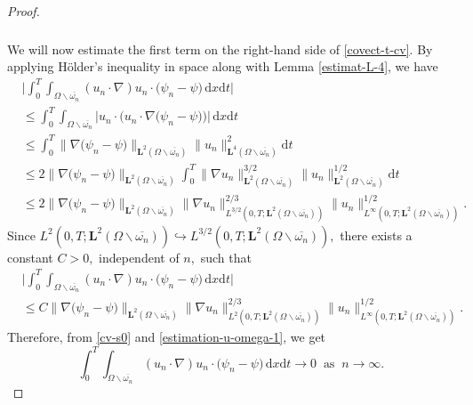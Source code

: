 \documentclass[a4paper,12pt,reqno,natbib]{amsart}
\newcommand{\dx} {\displaystyle\mathrm{d}x}
\newcommand{\dt} {\displaystyle\mathrm{d}t}
\def\L{\textbf{L}}
\begin{document}
\begin{proof}
\begin{align}
\begin{split}
    \end{split}
\end{align} 
We will now estimate the first term on the right-hand side of \eqref{covect-t-cv}.  By applying H\"older's inequality in space along with Lemma \ref{estimat-L-4}, we have
\begin{align*}
&\big|\int_0^T\int_{\Omega\backslash\overline{\omega_n}} (u_n\cdot \nabla) u_n \cdot \big(\psi_n-\psi\big)\, \dx\dt\big|\\
&\leq\int_0^T\int_{\Omega\backslash\overline{\omega_n}} \big|u_n\cdot\big( u_n\cdot \nabla\big(\psi_n-\psi\big)\big)\big|\, \dx\dt\\
&\leq \int_0^T\big\| \nabla\big(\psi_n-\psi\big) \big\|_{\L^2(\Omega\backslash\overline{\omega_n})} \big\| u_n \big\|_{\L^4(\Omega\backslash\overline{\omega_n})}^2\dt\\
&\leq 2 \big\| \nabla\big(\psi_n-\psi\big) \big\|_{\L^2(\Omega\backslash\overline{\omega_n})} \int_0^T\big\|\nabla u_n \big\|_{\L^2(\Omega\backslash\overline{\omega_n})}^{3/2} \big\| u_n \big\|_{\L^2(\Omega\backslash\overline{\omega_n})}^{1/2}\dt\\
&\leq 2 \big\| \nabla\big(\psi_n-\psi\big) \big\|_{\L^2(\Omega\backslash\overline{\omega_n})} \big\|\nabla u_n \big\|_{L^{3/2}(0,T;\L^{2}(\Omega\backslash\overline{\omega_n}))}^{2/3} \big\| u_n \big\|_{L^\infty(0,T;\L^2(\Omega\backslash\overline{\omega_n}))}^{1/2}.
\end{align*} 
Since $L^{2}(0,T;\L^{2}(\Omega\backslash\overline{\omega_n}))\hookrightarrow L^{3/2}(0,T;\L^{2}(\Omega\backslash\overline{\omega_n})),$  there exists a constant $C>0,$ independent of $n,$ such that
\begin{align*}
&\big|\int_0^T\int_{\Omega\backslash\overline{\omega_n}} (u_n\cdot \nabla) u_n \cdot \big(\psi_n-\psi\big)\, \dx\dt\big|\\
&\leq C \big\| \nabla\big(\psi_n-\psi\big) \big\|_{\L^2(\Omega\backslash\overline{\omega_n})} \big\|\nabla u_n \big\|_{L^{2}(0,T;\L^{2}(\Omega\backslash\overline{\omega_n}))}^{2/3} \big\| u_n \big\|_{L^\infty(0,T;\L^2(\Omega\backslash\overline{\omega_n}))}^{1/2}.
\end{align*} 
Therefore, from \eqref{cv-s0} and \eqref{estimation-u-omega-1}, we get
\begin{equation}
    \int_0^T\int_{\Omega\backslash\overline{\omega_n}} (u_n\cdot \nabla) u_n \cdot \big(\psi_n-\psi\big)\, \dx\dt\longrightarrow  0\;\;\text{as}\;\; n\longrightarrow\infty.
\end{equation}



\end{proof}
\end{document}
